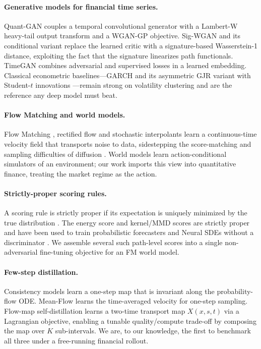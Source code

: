 \documentclass[11pt]{article}
\begin{document}
\paragraph{Generative models for financial time series.}
Quant-GAN \citep{wiese2020quant} couples a temporal convolutional generator with a
Lambert-W heavy-tail output transform \citep{goerg2015lambert} and a WGAN-GP
objective. Sig-WGAN and its conditional variant
\citep{ni2021sigwgan,ni2020conditional} replace the learned critic with a
signature-based Wasserstein-1 distance, exploiting the fact that the signature
\citep{lyons2007differential} linearizes path functionals. TimeGAN
\citep{yoon2019timegan} combines adversarial and supervised losses in a learned
embedding. Classical econometric baselines---GARCH and its asymmetric GJR variant
with Student-$t$ innovations \citep{bollerslev1986garch,glosten1993relation,
bollerslev1987conditionally}---remain strong on volatility clustering and are the
reference any deep model must beat.

\paragraph{Flow Matching and world models.}
Flow Matching \citep{lipman2023flow}, rectified flow \citep{liu2023rectified} and
stochastic interpolants \citep{albergo2023stochastic} learn a continuous-time
velocity field that transports noise to data, sidestepping the score-matching and
sampling difficulties of diffusion \citep{ho2020denoising,karras2022elucidating}.
World models \citep{ha2018world,alonso2024diamond} learn action-conditional
simulators of an environment; our work imports this view into quantitative
finance, treating the market regime as the action.

\paragraph{Strictly-proper scoring rules.}
A scoring rule is strictly proper if its expectation is uniquely minimized by the
true distribution \citep{gneiting2007strictly}. The energy score and
kernel/MMD scores \citep{gretton2012kernel} are strictly proper and have been used
to train probabilistic forecasters \citep{pacchiardi2024probabilistic} and Neural
SDEs without a discriminator \citep{issa2023nonadversarial}. We assemble several
such path-level scores into a single non-adversarial fine-tuning objective for an
FM world model.

\paragraph{Few-step distillation.}
Consistency models \citep{song2023consistency,song2024improved} learn a one-step
map that is invariant along the probability-flow ODE. Mean-Flow
\citep{geng2025meanflow} learns the time-averaged velocity for one-step sampling.
Flow-map self-distillation \citep{boffi2025flowmaps} learns a two-time transport
map $X(x,s,t)$ via a Lagrangian objective, enabling a tunable
quality/compute trade-off by composing the map over $K$ sub-intervals. We are, to
our knowledge, the first to benchmark all three under a free-running financial
rollout.
\end{document}
